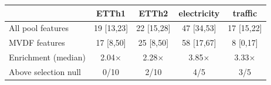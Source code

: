 \begin{tabular}{|l|c|c|c|c|}
\hline
 & ETTh1 & ETTh2 & electricity & traffic \\
\hline
All pool features & 19 [13,23] & 22 [15,28] & 47 [34,53] & 17 [15,22] \\
MVDF features & 17 [8,50] & 25 [8,50] & 58 [17,67] & 8 [0,17] \\
Enrichment (median) & 2.04$\times$ & 2.28$\times$ & 3.85$\times$ & 3.33$\times$ \\
Above selection null & 0/10 & 2/10 & 4/5 & 3/5 \\
\hline
\end{tabular}

